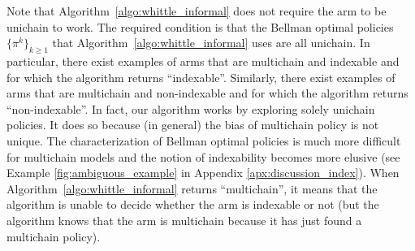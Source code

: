 Note that Algorithm~\ref{algo:whittle_informal} does not require the arm to be unichain to work. The required condition is that the Bellman optimal policies $\{\pi^k\}_{k\ge1}$ that Algorithm~\ref{algo:whittle_informal} uses are all unichain. In particular, there exist examples of arms that are multichain and indexable and for which the algorithm returns ``indexable''. Similarly, there exist examples of arms that are multichain and non-indexable and for which the algorithm returns ``non-indexable''. In fact, our algorithm works by exploring solely unichain policies. It does so because (in general) the bias of  multichain policy is not unique. The characterization of Bellman optimal policies is much more difficult for multichain models and the notion of indexability becomes more elusive (see Example \ref{fig:ambiguous_example} in Appendix \ref{apx:discussion_index}). When Algorithm~\ref{algo:whittle_informal} returns ``multichain'', it means that the algorithm is unable to decide whether the arm is indexable or not (but the algorithm knows that the arm is multichain because it has just found a multichain policy).

